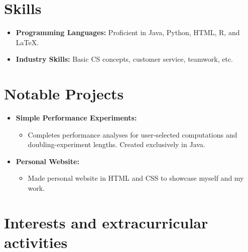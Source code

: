 \documentclass[11pt,a4paper,sans]{moderncv}
\begin{document}
\section{Skills}

\vspace{2pt}

\begin{itemize} %
\item \textbf{Programming Languages:} Proficient in Java, Python, HTML, R, and LaTeX.
\vspace{2pt}
\item \textbf{Industry Skills:} Basic CS concepts, customer service, teamwork, etc.
\end{itemize} %


\section{Notable Projects}

\vspace{2pt}

\begin{itemize} %
\item \textbf{Simple Performance Experiments:}
\begin{itemize} %
  \item Completes performance analyses for user-selected computations and doubling-experiment lengths. Created exclusively in Java.
\end{itemize} %
\vspace{2pt}
\item \textbf{Personal Website:}
\begin{itemize} %
  \item Made personal website in HTML and CSS to showcase myself and my work.
\end{itemize} %
\end{itemize} %


\section{Interests and extracurricular activities}
\vspace{2pt}
\end{document}
